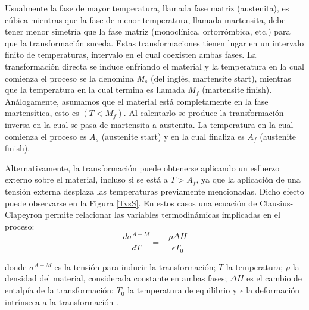 \documentclass[12pt]{article}
\theoremstyle{definition}
\theoremstyle{remark}
\begin{document}
Usualmente la fase de mayor temperatura, llamada fase matriz (austenita), es cúbica mientras que la fase de menor temperatura, llamada martensita, debe tener menor simetría que la fase matriz (monoclínica, ortorrómbica, etc.) para que la transformación suceda\citep{Malvasio}. Estas transformaciones tienen lugar en un intervalo finito de temperaturas, intervalo en el cual coexisten ambas fases. La transformación directa se induce enfriando el material y la temperatura en la cual comienza el proceso se la denomina $M_s$ (del inglés, martensite start), mientras que la temperatura en la cual termina es llamada $M_f$ (martensite finish). Análogamente, asumamos que el material está completamente en la fase martensítica, esto es $(T < M_f)$. Al calentarlo se produce la transformación inversa en la cual se pasa de martensita a austenita. La temperatura en la cual comienza el proceso es $A_s$ (austenite start) y en la cual finaliza es $A_f$ (austenite finish)\citep{Santamarta}.

Alternativamente, la transformación puede obtenerse aplicando un esfuerzo externo sobre el material, incluso si se está a $T > A_f$, ya que la aplicación de una tensión externa desplaza las temperaturas previamente mencionadas. Dicho efecto puede observarse en la Figura \ref{TvsS}. En estos casos una ecuación de Clausius-Clapeyron permite relacionar las variables termodinámicas implicadas en el proceso:
\begin{equation}
	\frac{d\sigma^{A-M}}{dT} = -\frac{\rho \Delta H}{\epsilon T_0}
\end{equation}

donde $\sigma^{A-M}$ es la tensión para inducir la transformación; $T$ la temperatura; $\rho$ la densidad del material, considerada constante en ambas fases; $\Delta H$ es el cambio de entalpía de la transformación; $T_0$ la temperatura de equilibrio y $\epsilon$ la deformación intrínseca a la transformación \citep{Malvasio}.
\end{document}
